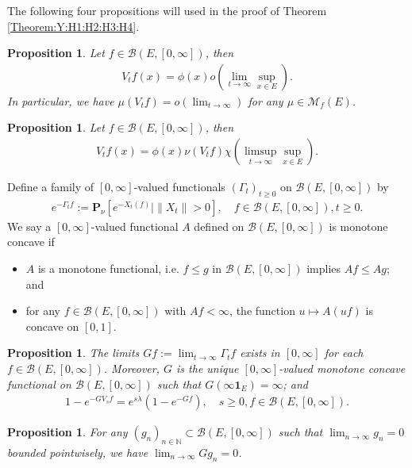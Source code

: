 \documentclass[12pt,a4paper]{amsart}
\numberwithin{equation}{section}
\theoremstyle{plain}
\newtheorem{prop}[thm]{Proposition}
\theoremstyle{definition}
\theoremstyle{remark}
\begin{document}
The following four propositions will used in the proof of Theorem \ref{Theorem:Y:H1:H2:H3:H4}.
\begin{prop} \label{Proposition:Vf1:H1:H2:H4}
Let $f\in \mathcal B(E, [0,\infty])$, then
\begin{align}
 V_tf(x) = \phi(x) o(\lim_{t\to \infty} \sup_{x\in E}).
 \end{align}
In particular, we have $\mu(V_tf)= o(\lim_{t\to \infty})$ for any $\mu \in \mathcal M_f(E)$.
\end{prop}
\begin{prop} \label{Proposition:Vf2:H1:H2:H3:H4}
Let $f\in \mathcal B(E,[0,\infty])$, then
\begin{align}
V_tf(x)
=\phi(x) \nu (V_tf) 
\chi(\limsup_{t\to \infty} \sup_{x\in E}).
\end{align}
\end{prop}
\par
Define a family of $[0,\infty]$-valued functionals $(\Gamma_t)_{t\geq 0}$ on $\mathcal B(E,[0,\infty])$ by
\begin{align}
 e^{-\Gamma_t f}
:= \mathbf P_{\nu}[e^{- X_t(f)}| \|X_t\| > 0],
 \quad f\in \mathcal B(E,[0,\infty]), t \geq 0.
 \end{align}
We say a $[0,\infty]$-valued functional $A$ defined on $\mathcal B(E,[0,\infty])$ is monotone concave if
\begin{itemize}
\item
$A$ is a monotone functional, i.e. $f\leq g$ in $\mathcal B(E,[0,\infty])$ implies $Af \leq Ag$; and
\item
for any $f\in \mathcal B(E,[0,\infty])$ with $Af< \infty$, the function $u \mapsto A(uf)$ is concave on $[0,1]$.
\end{itemize}
\begin{prop} \label{Proposition:G:H1:H2:H3:H4}
The limits $Gf:= \lim_{t\to \infty} \Gamma_t f$ exists in $[0,\infty]$ for each $f\in \mathcal B(E,[0,\infty])$.
Moreover, $G$ is the unique $[0,\infty]$-valued monotone concave functional on $\mathcal B(E,[0,\infty])$ such that $G(\infty \mathbf 1_E) = \infty$; and
\begin{align}
1 - e^{- GV_s f}
= e^{s\lambda} (1 - e^{-Gf}),
\quad s\geq 0, f\in \mathcal B(E,[0,\infty]).
\end{align}
\end{prop}
\begin{prop} \label{Proposition:GD:H1:H2:H3:H4}
For any $(g_n)_{n\in \mathbb N} \subset \mathcal B(E,[0,\infty])$ such that $\lim_{n\to \infty} g_n = 0$ bounded pointwisely, we have $\lim_{n\to \infty} G g_n = 0$.
\end{prop}
\end{document}
